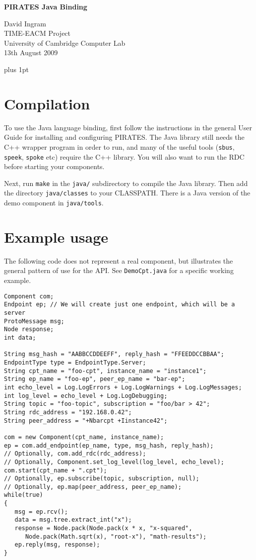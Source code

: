\documentclass[12pt,a4paper,twoside]{article}
\renewcommand{\_}{\texttt{\symbol{95}}}
\begin{document}
\centerline{\textbf{\LARGE PIRATES Java Binding}}
\begin{center} \large
David Ingram\\
TIME-EACM Project\\
University of Cambridge Computer Lab\\
13th August 2009\\
\end{center}

{ \parskip 1mm plus 1pt \tableofcontents }
\pagestyle{fancy}

\section{Compilation}

To use the Java language binding, first follow the instructions
in the general User Guide for installing and configuring PIRATES.
The Java library still needs the C++ wrapper program in order to run,
and many of the useful tools (\verb^sbus^, \verb^speek^, \verb^spoke^ etc)
require the C++ library. You will also want to run the RDC before
starting your components.

Next, run \verb^make^ in the
\verb^java/^ subdirectory to compile the Java library.
Then add the directory
\verb^java/classes^ to your CLASSPATH. There is a Java version
of the demo component in \verb^java/tools^.

\section{Example usage}

The following code does not represent a real component, but illustrates
the general pattern of use for the API. See \verb^DemoCpt.java^
for a specific working example.

\begin{verbatim}
Component com;
Endpoint ep; // We will create just one endpoint, which will be a server
ProtoMessage msg;
Node response;
int data;

String msg_hash = "AABBCCDDEEFF", reply_hash = "FFEEDDCCBBAA";
EndpointType type = EndpointType.Server;
String cpt_name = "foo-cpt", instance_name = "instance1";
String ep_name = "foo-ep", peer_ep_name = "bar-ep";
int echo_level = Log.LogErrors + Log.LogWarnings + Log.LogMessages;
int log_level = echo_level + Log.LogDebugging;
String topic = "foo-topic", subscription = "foo/bar > 42";
String rdc_address = "192.168.0.42";
String peer_address = "+Nbarcpt +Iinstance42";

com = new Component(cpt_name, instance_name);
ep = com.add_endpoint(ep_name, type, msg_hash, reply_hash);
// Optionally, com.add_rdc(rdc_address);
// Optionally, Component.set_log_level(log_level, echo_level);
com.start(cpt_name + ".cpt");
// Optionally, ep.subscribe(topic, subscription, null);
// Optionally, ep.map(peer_address, peer_ep_name);
while(true)
{
   msg = ep.rcv();
   data = msg.tree.extract_int("x");
   response = Node.pack(Node.pack(x * x, "x-squared",
      Node.pack(Math.sqrt(x), "root-x"), "math-results");
   ep.reply(msg, response);
}
\end{verbatim}
\end{document}
